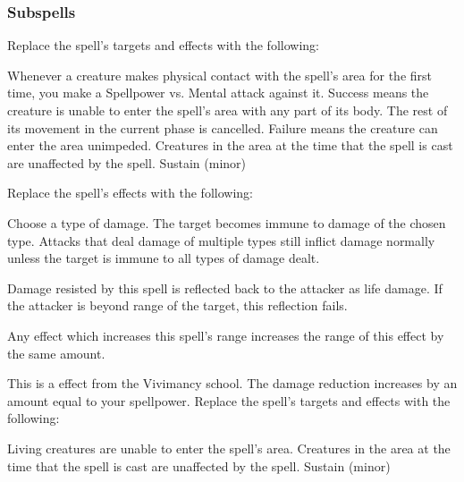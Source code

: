 \subsubsection{Subspells}
Replace the spell's targets and effects with the following:
\begin{spellcontent}
\begin{augmenttargetinginfo}
\end{augmenttargetinginfo}
\begin{augmenteffects}
\spelleffect
Whenever a creature makes physical contact with the spell's area for the first time, you make a Spellpower vs. Mental attack against it.
Success means the creature is unable to enter the spell's area with any part of its body.
The rest of its movement in the current phase is cancelled.
Failure means the creature can enter the area unimpeded.
Creatures in the area at the time that the spell is cast are unaffected by the spell.
\spelldur Sustain (minor)
\end{augmenteffects}
\end{spellcontent}
Replace the spell's effects with the following:
\begin{spellcontent}
\begin{augmenteffects}
\spelleffect
Choose a type of damage.
The target becomes immune to damage of the chosen type.
Attacks that deal damage of multiple types still inflict damage normally unless the target is immune to all types of damage dealt.
\end{augmenteffects}
\end{spellcontent}
Damage resisted by this spell is reflected back to the attacker as life damage.
If the attacker is beyond \rngclose range of the target, this reflection fails.
\par Any effect which increases this spell's range increases the range of this effect by the same amount.
\par
This is a  effect from the Vivimancy school.
The damage reduction increases by an amount equal to your spellpower.
Replace the spell's targets and effects with the following:
\begin{spellcontent}
\begin{augmenttargetinginfo}
\end{augmenttargetinginfo}
\begin{augmenteffects}
\spelleffect
Living creatures are unable to enter the spell's area.
Creatures in the area at the time that the spell is cast are unaffected by the spell.
\spelldur Sustain (minor)
\end{augmenteffects}
\end{spellcontent}
